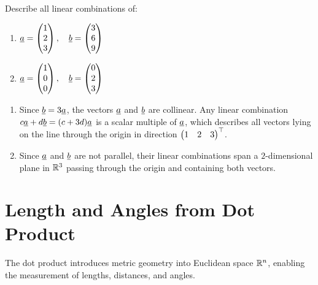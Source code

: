 \begin{exercise}
    Describe all linear combinations of:
    \begin{enumerate}[label=\arabic*.]
        \item $\underline{a} = \begin{pmatrix} 1 \\ 2 \\ 3 \end{pmatrix}, \quad \underline{b} = \begin{pmatrix} 3 \\ 6 \\ 9 \end{pmatrix}$
        \item $\underline{a} = \begin{pmatrix} 1 \\ 0 \\ 0 \end{pmatrix}, \quad \underline{b} = \begin{pmatrix} 0 \\ 2 \\ 3 \end{pmatrix}$
    \end{enumerate}   
\end{exercise}

\begin{solution}
    \begin{enumerate}[label=\arabic*.]
        \item Since $\underline{b} = 3\underline{a}$, the vectors $\underline{a}$ and $\underline{b}$ are collinear. Any linear combination $c\underline{a} + d\underline{b} = (c + 3d)\underline{a}$ is a scalar multiple of $\underline{a}$, which describes all vectors lying on the line through the origin in direction $\begin{pmatrix} 1 & 2 & 3 \end{pmatrix}^{\top}$.
        \item Since $\underline{a}$ and $\underline{b}$ are not parallel, their linear combinations span a $2$-dimensional plane in $\mathbb{R}^3$ passing through the origin and containing both vectors.
    \end{enumerate}
\end{solution}


\section{Length and Angles from Dot Product}

The dot product introduces metric geometry into Euclidean space $\mathbb{R}^n$, enabling the measurement of lengths, distances, and angles.

